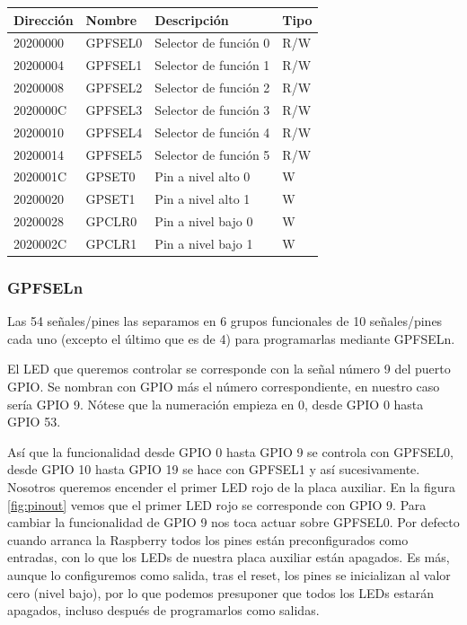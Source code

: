 \begin{table}
\centering
\begin{tabular}{ p{1.8cm} | p{2cm} | p{5cm} | p{1cm} }
{\bf Dirección} & {\bf Nombre} & {\bf Descripción} & {\bf Tipo} \\
\hline
20200000 & GPFSEL0 & Selector de función 0 & R/W \\
20200004 & GPFSEL1 & Selector de función 1 & R/W \\
20200008 & GPFSEL2 & Selector de función 2 & R/W \\
2020000C & GPFSEL3 & Selector de función 3 & R/W \\
20200010 & GPFSEL4 & Selector de función 4 & R/W \\
20200014 & GPFSEL5 & Selector de función 5 & R/W \\
2020001C & GPSET0  & Pin a nivel alto 0 & W   \\
20200020 & GPSET1  & Pin a nivel alto 1 & W   \\
20200028 & GPCLR0  & Pin a nivel bajo 0 & W  \\
2020002C & GPCLR1  & Pin a nivel bajo 1 & W  \\
\end{tabular}
\end{table}

\subsubsection{GPFSELn}

Las 54 señales/pines las separamos en 6
grupos funcionales de 10 señales/pines cada uno (excepto el último
que es de 4) para programarlas mediante GPFSELn.

El LED que queremos controlar se corresponde con la señal número 9 del puerto GPIO.
Se nombran con GPIO más el número correspondiente, en nuestro caso sería GPIO 9. Nótese
que la numeración empieza en 0, desde GPIO 0 hasta GPIO 53.

Así que la funcionalidad desde GPIO 0 hasta GPIO 9 se controla con
GPFSEL0, desde GPIO 10 hasta GPIO 19 se hace con GPFSEL1 y así
sucesivamente. Nosotros queremos encender el primer LED rojo de la placa auxiliar.
En la figura \ref{fig:pinout} vemos que el primer LED rojo se corresponde con GPIO 9.
Para cambiar la funcionalidad de GPIO 9 nos toca actuar sobre GPFSEL0. Por
defecto cuando arranca la Raspberry todos los pines están preconfigurados
como entradas, con lo que los LEDs de nuestra placa auxiliar
están apagados. Es más, aunque lo configuremos como salida, tras el reset,
los pines se inicializan al valor cero (nivel bajo), por lo que podemos presuponer que
todos los LEDs estarán apagados, incluso después de programarlos como salidas.

